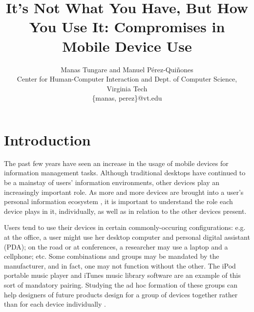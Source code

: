 \documentclass[twocolumn,final,10pt]{article}
\title{It's Not What You Have, But How You Use It: Compromises in Mobile Device Use}
\author{
  Manas Tungare and Manuel P\'erez-Qui\~nones
  \\
  Center for Human-Computer Interaction and Dept. of Computer Science, Virginia Tech
  \\
  \{manas, perez\}@vt.edu
}
\begin{document}
\maketitle


\section{Introduction}

The past few years have seen an increase in the usage of mobile devices for information management tasks. Although traditional desktops have continued to be a mainstay of users' information environments, other devices play an increasingly important role. As more and more devices are brought into a user's personal information ecosystem \cite{tungare_2006_personal}, it is important to understand the role each device plays in it, individually, as well as in relation to the other devices present.

Users tend to use their devices in certain commonly-occuring configurations: e.g. at the office, a user might use her desktop computer and personal digital assistant (PDA); on the road or at conferences, a researcher may use a laptop and a cellphone; etc. Some combinations and groups may be mandated by the manufacturer, and in fact, one may not function without the other. The iPod portable music player and iTunes music library software are an example of this sort of mandatory pairing. Studying the ad hoc formation of these groups can help designers of future products  design for a group of devices together rather than for each device individually \cite{pyla_2006_multiple}.
 
\end{document}

